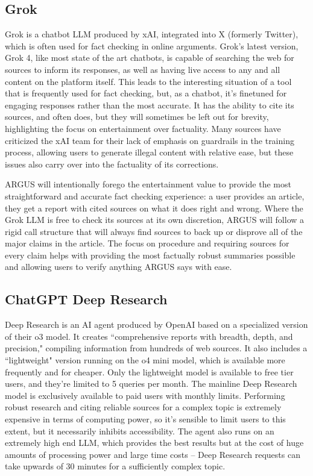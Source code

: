 \documentclass[conference]{IEEEtran}
\begin{document}
\subsection{Grok}
Grok is a chatbot LLM produced by xAI, integrated into X (formerly Twitter), which is often used for fact checking in online arguments\cite{esteban_ponce_de_leon_grok_2025}. Grok's latest version, Grok 4, like most state of the art chatbots, is capable of searching the web for sources to inform its responses, as well as having live access to any and all content on the platform itself. This leads to the interesting situation of a tool that is frequently used for fact checking, but, as a chatbot, it's finetuned for engaging responses rather than the most accurate. It has the ability to cite its sources, and often does, but they will sometimes be left out for brevity,  highlighting the focus on entertainment over factuality\cite{Grok4}. Many sources have criticized the xAI team for their lack of emphasis on guardrails in the training process, allowing users to generate illegal content with relative ease, but these issues also carry over into the factuality of its corrections\cite{MediumGrokGuardrails}.

ARGUS will intentionally forego the entertainment value to provide the most straightforward and accurate fact checking experience: a user provides an article, they get a report with cited sources on what it does right and wrong. Where the Grok LLM is free to check its sources at its own discretion, ARGUS will follow a rigid call structure that will always find sources to back up or disprove all of the major claims in the article. The focus on procedure and requiring sources for every claim helps with providing the most factually robust summaries possible and allowing users to verify anything ARGUS says with ease. 

\subsection{ChatGPT Deep Research}
Deep Research is an AI agent produced by OpenAI based on a specialized version of their o3 model\cite{introducingDR}. It creates ``comprehensive reports with breadth, depth, and precision," compiling information from hundreds of web sources\cite{DeepResearch}. It also includes a ``lightweight" version running on the o4 mini model, which is available more frequently and for cheaper. Only the lightweight model is available to free tier users, and they're limited to 5 queries per month. The mainline Deep Research model is exclusively available to paid users with monthly limits. Performing robust research and citing reliable sources for a complex topic is extremely expensive in terms of computing power, so it's sensible to limit users to this extent, but it necessarily inhibits accessibility. The agent also runs on an extremely high end LLM, which provides the best results but at the cost of huge amounts of processing power and large time costs -- Deep Research requests can take upwards of 30 minutes for a sufficiently complex topic\cite{DeepResearch}.
\end{document}
